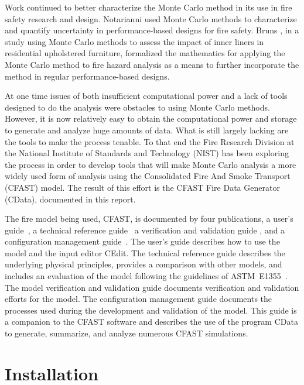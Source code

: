 \documentclass[12pt,twoside]{book}
\begin{document}
Work continued to better characterize the Monte Carlo method in its use in fire safety research and design. Notarianni \cite{Notarianni:2000} used Monte Carlo methods to characterize and quantify uncertainty in performance-based designs for fire safety. Bruns \cite{bruns_tn_2016}, in a study using Monte Carlo methods to assess the impact of inner liners in residential upholstered furniture, formalized the mathematics for applying the Monte Carlo method to fire hazard analysis as a means to further incorporate the method in regular performance-based designs.

At one time issues of both insufficient computational power and a lack of tools designed to do the analysis were obstacles to using Monte Carlo methods. However, it is now relatively easy to obtain the computational power and storage to generate and analyze huge amounts of data. What is still largely lacking are the tools to make the process tenable. To that end the Fire Research Division at the National Institute of Standards and Technology (NIST) has been exploring the process \cite{NIST_TN_2041,Reneke_2017,Reneke_2018,Cleary_2019} in order to develop tools that will make Monte Carlo analysis a more widely used form of analysis using the Consolidated Fire And Smoke Transport (CFAST) model. The result of this effort is the CFAST Fire Data Generator (CData), documented in this report.

The fire model being used, CFAST, is documented by four publications, a user's guide~\cite{CFAST_Users_Guide_7}, a technical reference guide~\cite{CFAST_Tech_Guide_7} a verification and validation guide \cite{CFAST_Valid_Guide_7}, and a configuration management guide~\cite{CFAST_Config_Guide_7}. The user's guide describes how to use the model and the input editor CEdit. The technical reference guide describes the underlying physical principles, provides a comparison with other models, and includes an evaluation of the model following the guidelines of ASTM~E1355~\cite{CFAST:ASTM:E1355}. The model verification and validation guide documents verification and validation efforts for the model. The configuration management guide documents the processes used during the development and validation of the model. This guide is a companion to the CFAST software and describes the use of the program CData to generate, summarize, and analyze numerous CFAST simulations.

\section{Installation}
\end{document}
